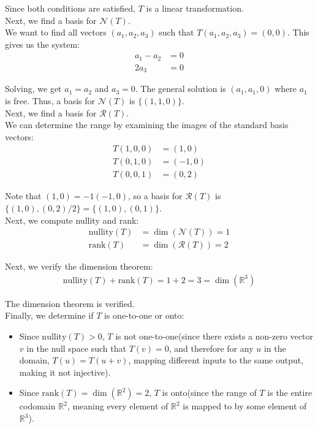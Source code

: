 \documentclass{article}
\begin{document}
Since both conditions are satisfied, $T$ is a linear transformation. \\

Next, we find a basis for $\mathcal{N}(T)$. \\

We want to find all vectors $(a_1, a_2, a_3)$ such that $T(a_1, a_2, a_3) = (0, 0)$.
This gives us the system:
\begin{align*}
a_1 - a_2 &= 0\\
2a_3 &= 0
\end{align*}

Solving, we get $a_1 = a_2$ and $a_3 = 0$. The general solution is $(a_1, a_1, 0)$ where $a_1$ is free.
Thus, a basis for $\mathcal{N}(T)$ is $\{(1, 1, 0)\}$. \\

Next, we find a basis for $\mathcal{R}(T)$. \\

We can determine the range by examining the images of the standard basis vectors:
\begin{align*}
T(1,0,0) &= (1,0)\\
T(0,1,0) &= (-1,0)\\
T(0,0,1) &= (0,2)
\end{align*}

Note that $(1,0) = -1(-1,0)$, so a basis for $\mathcal{R}(T)$ is $\{(1,0), (0,2)/2\} = \{(1,0), (0,1)\}$. \\

Next, we compute nullity and rank:
\begin{align*}
    \text{nullity}(T) &= \dim(\mathcal{N}(T)) = 1\\
    \text{rank}(T) &= \dim(\mathcal{R}(T)) = 2
\end{align*}

Next, we verify the dimension theorem:
\begin{align*}
    \text{nullity}(T) + \text{rank}(T) = 1 + 2 = 3 = \dim(\mathbb{R}^3)
\end{align*}

The dimension theorem is verified. \\

Finally, we determine if $T$ is one-to-one or onto:
\begin{itemize}
    \item Since $\text{nullity}(T) > 0$, $T$ is not one-to-one(since there exists a non-zero vector $v$ in the null space such that $T(v) = 0$, and therefore for any $u$ in the domain, $T(u) = T(u + v)$, mapping different inputs to the same output, making it not injective).
    \item Since $\text{rank}(T) = \dim(\mathbb{R}^2) = 2$, $T$ is onto(since the range of $T$ is the entire codomain $\mathbb{R}^2$, meaning every element of $\mathbb{R}^2$ is mapped to by some element of $\mathbb{R}^3$).
\end{itemize}
\end{document}
